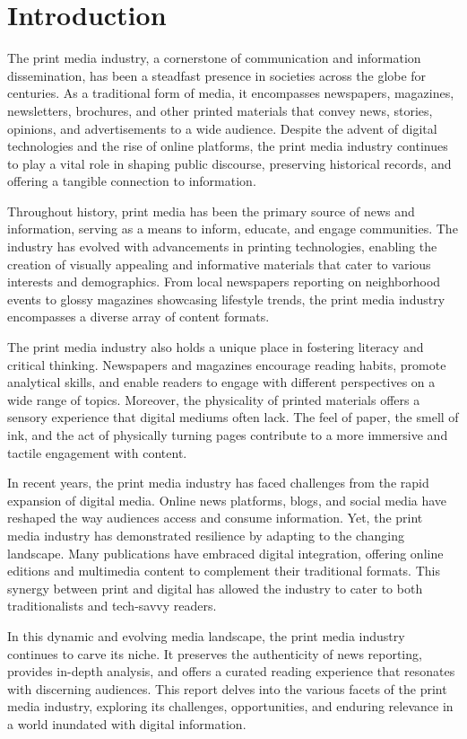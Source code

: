\newpage
\section{Introduction}
The print media industry, a cornerstone of communication and information dissemination, has been a steadfast presence in societies across the globe for centuries. As a traditional form of media, it encompasses newspapers, magazines, newsletters, brochures, and other printed materials that convey news, stories, opinions, and advertisements to a wide audience. Despite the advent of digital technologies and the rise of online platforms, the print media industry continues to play a vital role in shaping public discourse, preserving historical records, and offering a tangible connection to information.

Throughout history, print media has been the primary source of news and information, serving as a means to inform, educate, and engage communities. The industry has evolved with advancements in printing technologies, enabling the creation of visually appealing and informative materials that cater to various interests and demographics. From local newspapers reporting on neighborhood events to glossy magazines showcasing lifestyle trends, the print media industry encompasses a diverse array of content formats.

The print media industry also holds a unique place in fostering literacy and critical thinking. Newspapers and magazines encourage reading habits, promote analytical skills, and enable readers to engage with different perspectives on a wide range of topics. Moreover, the physicality of printed materials offers a sensory experience that digital mediums often lack. The feel of paper, the smell of ink, and the act of physically turning pages contribute to a more immersive and tactile engagement with content.

In recent years, the print media industry has faced challenges from the rapid expansion of digital media. Online news platforms, blogs, and social media have reshaped the way audiences access and consume information. Yet, the print media industry has demonstrated resilience by adapting to the changing landscape. Many publications have embraced digital integration, offering online editions and multimedia content to complement their traditional formats. This synergy between print and digital has allowed the industry to cater to both traditionalists and tech-savvy readers.

In this dynamic and evolving media landscape, the print media industry continues to carve its niche. It preserves the authenticity of news reporting, provides in-depth analysis, and offers a curated reading experience that resonates with discerning audiences. This report delves into the various facets of the print media industry, exploring its challenges, opportunities, and enduring relevance in a world inundated with digital information.


